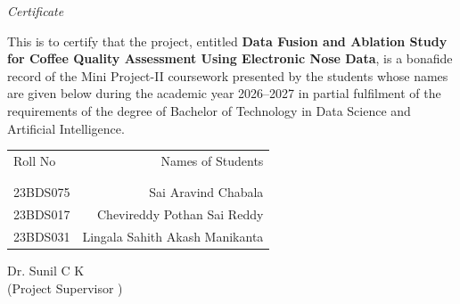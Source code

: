 \documentclass[12pt]{article}
\begin{document}
\newpage
\thispagestyle{empty}
\clearpage             %
\thispagestyle{empty}  %
\phantom{a}            %
\newpage
\thispagestyle{empty}

\begin{center}

	\emph{\huge{Certificate}}\\[2.5cm]
\end{center}
\normalsize This is to certify that the project, entitled \textbf{Data Fusion and Ablation Study for Coffee Quality Assessment Using Electronic Nose Data}, is a bonafide record of the Mini Project-II coursework presented by the students whose names are given below during the academic year 2026--2027 in partial fulfilment of the requirements of the degree of Bachelor of Technology in Data Science and Artificial Intelligence.\\[1.0cm]

\begin{table}[h]
	\centering
	\begin{tabular}{lr}
		Roll No & Names of Students \\ \\ \hline
		\\
		23BDS075 & Sai Aravind Chabala \\
		23BDS017 & Chevireddy Pothan Sai Reddy \\
		23BDS031 & Lingala Sahith Akash Manikanta \\
	\end{tabular}
\end{table}

\vfill


\begin{flushright}
	Dr. Sunil C K\\
	(Project Supervisor )\\[1.5cm]
\end{flushright}

\newpage
\hypersetup{pageanchor=true}
\setcounter{page}{1}
\hypersetup{linkcolor=black}    %
\tableofcontents
\newpage
{}
\listoffigures
\newpage
{}
\listoftables
\hypersetup{linkcolor=linkblue}
\end{document}
